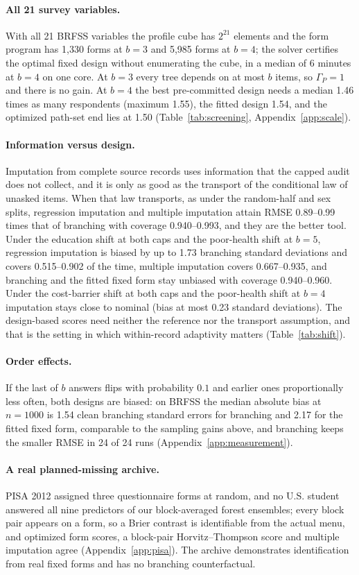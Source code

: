 \paragraph{All 21 survey variables.}
With all 21 BRFSS variables the profile cube has $2^{21}$ elements and the form program has 1,330 forms at $b=3$ and 5,985 forms at $b=4$; the solver certifies the optimal fixed design without enumerating the cube, in a median of 6 minutes at $b=4$ on one core. At $b=3$ every tree depends on at most $b$ items, so $\Gamma_P=1$ and there is no gain. At $b=4$ the best pre-committed design needs a median 1.46 times as many respondents (maximum 1.55), the fitted design 1.54, and the optimized path-set end lies at 1.50 (Table~\ref{tab:screening}, Appendix~\ref{app:scale}).

\paragraph{Information versus design.}
Imputation from complete source records uses information that the capped audit does not collect, and it is only as good as the transport of the conditional law of unasked items. When that law transports, as under the random-half and sex splits, regression imputation and multiple imputation attain RMSE 0.89--0.99 times that of branching with coverage 0.940--0.993, and they are the better tool. Under the education shift at both caps and the poor-health shift at $b=5$, regression imputation is biased by up to 1.73 branching standard deviations and covers 0.515--0.902 of the time, multiple imputation covers 0.667--0.935, and branching and the fitted fixed form stay unbiased with coverage 0.940--0.960. Under the cost-barrier shift at both caps and the poor-health shift at $b=4$ imputation stays close to nominal (bias at most 0.23 standard deviations). The design-based scores need neither the reference nor the transport assumption, and that is the setting in which within-record adaptivity matters (Table~\ref{tab:shift}).

\paragraph{Order effects.}
If the last of $b$ answers flips with probability $0.1$ and earlier ones proportionally less often, both designs are biased: on BRFSS the median absolute bias at $n=1000$ is 1.54 clean branching standard errors for branching and 2.17 for the fitted fixed form, comparable to the sampling gains above, and branching keeps the smaller RMSE in 24 of 24 runs (Appendix~\ref{app:measurement}).

\paragraph{A real planned-missing archive.}
PISA 2012 assigned three questionnaire forms at random, and no U.S. student answered all nine predictors of our block-averaged forest ensembles; every block pair appears on a form, so a Brier contrast is identifiable from the actual menu, and optimized form scores, a block-pair Horvitz--Thompson score and multiple imputation agree (Appendix~\ref{app:pisa}). The archive demonstrates identification from real fixed forms and has no branching counterfactual.
